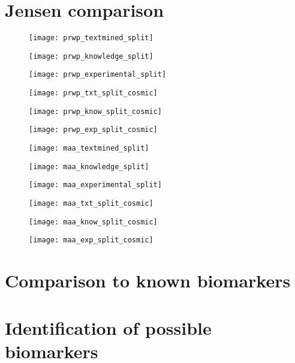 \section{Jensen comparison}
\begin{figure}
    \label{fig:txt-iref-prwp}
    \texttt{[image: prwp\_textmined\_split]}
\end{figure}
\begin{figure}
    \label{fig:know-iref-prwp}
    \texttt{[image: prwp\_knowledge\_split]}
\end{figure}
\begin{figure}
    \label{fig:exp-iref-prwp}
    \texttt{[image: prwp\_experimental\_split]}
\end{figure}
\begin{figure}
    \label{fig:txt-cosmic-prwp}
    \texttt{[image: prwp\_txt\_split\_cosmic]}
\end{figure}
\begin{figure}
    \label{fig:know-cosmic-prwp}
    \texttt{[image: prwp\_know\_split\_cosmic]}
\end{figure}
\begin{figure}
    \label{fig:exp-cosmic-prwp}
    \texttt{[image: prwp\_exp\_split\_cosmic]}
\end{figure}

\begin{figure}
    \label{fig:txt-iref-maa}
    \texttt{[image: maa\_textmined\_split]}
\end{figure}
\begin{figure}
    \label{fig:know-iref-maa}
    \texttt{[image: maa\_knowledge\_split]}
\end{figure}
\begin{figure}
    \label{fig:exp-iref-maa}
    \texttt{[image: maa\_experimental\_split]}
\end{figure}
\begin{figure}
    \label{fig:txt-cosmic-maa}
    \texttt{[image: maa\_txt\_split\_cosmic]}
\end{figure}
\begin{figure}
    \label{fig:know-cosmic-maa}
    \texttt{[image: maa\_know\_split\_cosmic]}
\end{figure}
\begin{figure}
    \label{fig:exp-cosmic-maa}
    \texttt{[image: maa\_exp\_split\_cosmic]}
\end{figure}

\section{Comparison to known biomarkers}
\section{Identification of possible biomarkers}
